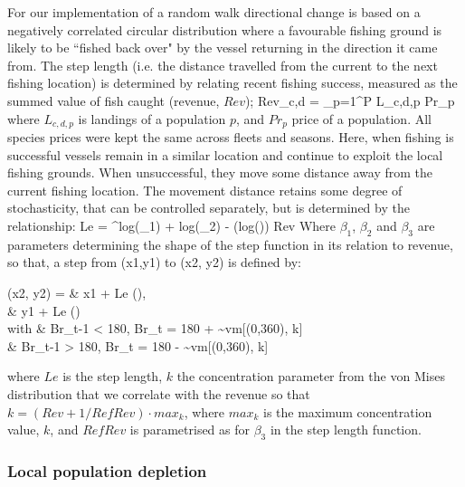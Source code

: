 \documentclass[review]{elsarticle}
\let\oldequation\equation
\let\oldendequation\endequation
\renewenvironment{equation}
 {\linenomathNonumbers\oldequation}
 {\oldendequation\endlinenomath}
\begin{document}
For our implementation of a random walk directional change is based on a
negatively correlated circular distribution where a favourable fishing ground
is likely to be ``fished back over" by the vessel returning in the direction it
came from.  The step length (i.e. the distance travelled from the current to
the next fishing location) is determined by relating recent
fishing success, measured as the summed value of fish caught (revenue, $Rev$);
\begin{equation}
Rev_{c,d} = \sum_{p=1}^{P} L_{c,d,p} \cdot Pr_{p} 
\end{equation}
where $L_{c,d,p}$ is landings of a population $p$, and $Pr_{p}$ price of a
population. All species prices were kept the same across fleets and seasons.
Here, when fishing is successful vessels remain in a similar location and
continue to exploit the local fishing grounds. When unsuccessful, they move
some distance away from the current fishing location.  The movement distance
retains some degree of stochasticity, that can be controlled separately, but is
determined by the relationship: 
\begin{equation}
	Le = ^{log(\beta_{1}) + log(\beta_{2}) -
		\left(log\left(\right)\right) \cdot Rev
} 
\end{equation}
Where $\beta_{1}$, $\beta_{2}$ and $\beta_{3}$ are parameters determining the
shape of the step function in its relation to revenue, so that, a step from
(x1,y1) to (x2, y2) is defined by:
\begin{equation}
	\begin{split}
 (x2, y2) =  & x1 + Le \cdot \cos \left(\right), \\
             & y1 + Le \cdot \sin \left(\right) \\	
 with  \hspace{0.5cm}     & Br_{t-1} < 180, Br_{t} = 180 + \sim vm[(0,360), k] \\
 			  & Br_{t-1} > 180, Br_{t} = 180 - \sim vm[(0,360), k] \\
	\end{split}
\end{equation}
where $Le$ is the step length, $k$ the concentration parameter from the von
Mises distribution that we correlate with the revenue so that $k = (Rev + 1 /
RefRev) \cdot max_{k}$, where $max_{k}$ is the maximum concentration value,
$k$, and $RefRev$ is parametrised as for $\beta_{3}$ in the step length
function. 

\subsubsection{Local population depletion}
\end{document}
